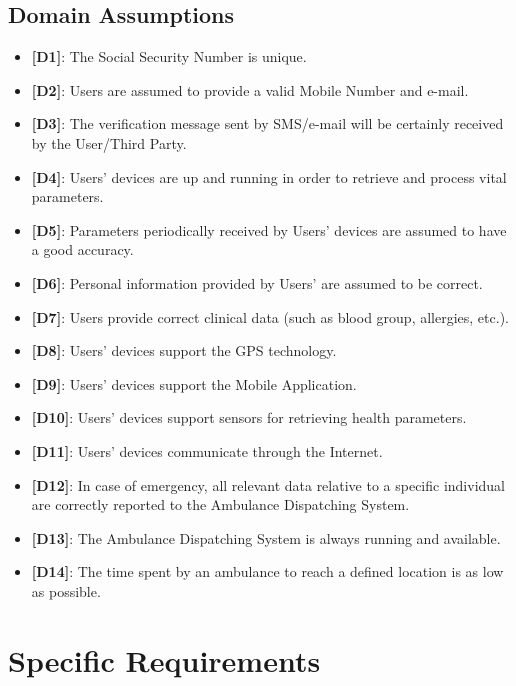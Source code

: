 \documentclass[12pt,a4paper]{article}
\begin{document}
		\subsection{Domain Assumptions}
			\begin{itemize}
				\item {\textbf[}\textbf{D1}{\textbf]}: The Social Security Number is unique.
				\item {\textbf[}\textbf{D2}{\textbf]}: Users are assumed to provide a valid Mobile Number and e-mail.
				\item {\textbf[}\textbf{D3}{\textbf]}: The verification message sent by SMS/e-mail will be certainly received by the User/Third Party.
				\item {\textbf[}\textbf{D4}{\textbf]}: Users' devices are up and running in order to retrieve and process vital parameters.
				\item {\textbf[}\textbf{D5}{\textbf]}: Parameters periodically received by Users' devices are assumed to have a good accuracy.
				\item {\textbf[}\textbf{D6}{\textbf]}: Personal information provided by Users' are assumed to be correct.
				\item {\textbf[}\textbf{D7}{\textbf]}: Users provide correct clinical data (such as blood group, allergies, etc.).
				\item {\textbf[}\textbf{D8}{\textbf]}: Users' devices support the GPS technology.
				\item {\textbf[}\textbf{D9}{\textbf]}: Users' devices support the Mobile Application.
				\item {\textbf[}\textbf{D10}{\textbf]}: Users' devices support sensors for retrieving health parameters.
				\item {\textbf[}\textbf{D11}{\textbf]}: Users' devices communicate through the Internet.
				\item {\textbf[}\textbf{D12}{\textbf]}: In case of emergency, all relevant data relative to a specific individual are correctly reported to the Ambulance Dispatching System.
				\item {\textbf[}\textbf{D13}{\textbf]}: The Ambulance Dispatching System is always running and available.
				\item {\textbf[}\textbf{D14}{\textbf]}: The time spent by an ambulance to reach a defined location is as low as possible.
			\end{itemize}

	\newpage
	\section{Specific Requirements}
\end{document}
